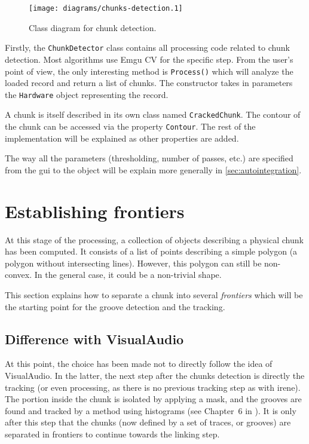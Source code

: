 \begin{figure}[!ht]
\centering
\texttt{[image: diagrams/chunks-detection.1]}
\caption{Class diagram for chunk detection.}
\label{fig:chunksdetectdiag}
\end{figure}

Firstly, the \texttt{ChunkDetector} class contains all processing code related to chunk detection. Most algorithms use Emgu CV for the specific step. From the user's point of view, the only interesting method is \texttt{Process()} which will analyze the loaded record and return a list of chunks. The constructor takes in parameters the \texttt{Hardware} object representing the record.

A chunk is itself described in its own class named \texttt{CrackedChunk}. The contour of the chunk can be accessed via the property \texttt{Contour}. The rest of the implementation will be explained as other properties are added.

The way all the parameters (thresholding, number of passes, etc.) are specified from the \gls{gui} to the object will be explain more generally in \autoref{sec:autointegration}.

\section{Establishing frontiers}
\label{sec:findfrontiers}

At this stage of the processing, a collection of objects describing a physical chunk has been computed. It consists of a list of points describing a simple polygon (a polygon without intersecting lines). However, this polygon can still be non-convex. In the general case, it could be a non-trivial shape.

This section explains how to separate a chunk into several \emph{frontiers} which will be the starting point for the groove detection and the tracking.

\subsection{Difference with VisualAudio}

At this point, the choice has been made not to directly follow the idea of VisualAudio. In the latter, the next step after the chunks detection is directly the tracking (or even processing, as there is no previous tracking step as with \gls{irene}). The portion inside the chunk is isolated by applying a mask, and the grooves are found and tracked by a method using histograms (see Chapter~6 in \cite{seydoux08}). It is only after this step that the chunks (now defined by a set of traces, or grooves) are separated in frontiers to continue towards the linking step.

